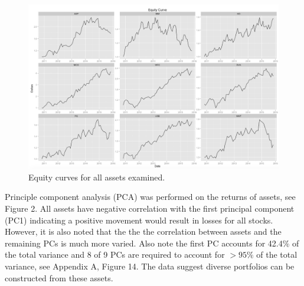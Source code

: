 \documentclass[10pt]{article_simple}
\begin{document}
\begin{figure}[H]
	\centering
  	\includegraphics[width=.75\linewidth]{equity_curve_adjusted}
  	\centering
  	\caption{Equity curves for all assets examined.}
\end{figure}

Principle component analysis (PCA) was performed on the returns of assets, see Figure 2. All assets have negative correlation with the first principal component (PC1) indicating a positive movement would result in losses for all stocks. However, it is also noted that the the the correlation between assets and the remaining PCs is much more varied. Also note the first PC accounts for 42.4\% of the total variance and 8 of 9 PCs are required to account for $>95\%$ of the total variance, see Appendix A, Figure 14. The data suggest diverse portfolios can be constructed from these assets.
\end{document}
